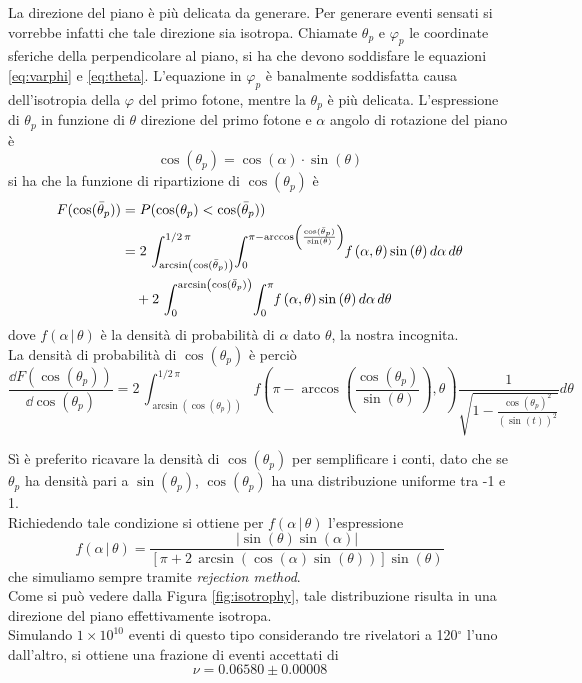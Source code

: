 La direzione del piano è più delicata da generare. Per generare eventi sensati si vorrebbe infatti che tale direzione sia isotropa. Chiamate $\theta_p$ e $\varphi_p$ le coordinate sferiche della perpendicolare al piano, si ha che devono soddisfare le equazioni \ref{eq:varphi} e \ref{eq:theta}. L'equazione in $\varphi_p$ è banalmente soddisfatta causa dell'isotropia della $\varphi$ del primo fotone, mentre la $\theta_p$ è più delicata.
L'espressione di $\theta_p$ in funzione di $\theta$ direzione del primo fotone e $\alpha$ angolo di rotazione del piano è
\begin{equation}
	\cos(\theta_p)=\cos(\alpha)\cdot\sin(\theta)
\end{equation}
si ha che la funzione di ripartizione di $\cos(\theta_p)$ è
\begin{equation}
\begin{split}
	F(\cos(\bar\theta_p))& = P(\cos(\theta_p) < \cos(\bar\theta_p)) \\
	& = 2\,\int _{\arcsin \left( \cos(\bar\theta_p) \right) }^{1/2\,\pi }\!\int _{0}^{\pi -\arccos \left( {\frac {\cos(\bar\theta_p)}{\sin \left( \theta \right) }} \right) }\!{\it f} \left( \alpha,\theta \right) \sin \left( \theta \right) {d\alpha}\,{d\theta}\\
	&\quad+2\,\int _{0}^{\arcsin \left( \cos(\bar\theta_p) \right) }\!\int _{0}^{\pi }\!{\it f} \left( \alpha,\theta \right) \sin \left( \theta \right) {d\alpha}\,{d\theta}
\end{split}
\end{equation}
dove $f(\alpha\,|\,\theta)$ è la densità di probabilità di $\alpha$ dato $\theta$, la nostra incognita.\\
La densità di probabilità di $\cos(\theta_p)$ è perciò
\begin{equation}
	\frac{\dd F(\cos(\theta_p))}{\dd\cos(\theta_p)} = 2\,\int _{\arcsin \left( \cos(\theta_p) \right) }^{1/2\,\pi }\!f \left( \pi -\arccos \left( {\frac {\cos(\theta_p)}{\sin \left( \theta \right) }} \right) ,\theta \right) {\frac {1}{\sqrt {1-{\frac {{\cos(\theta_p)}^{2}}{ \left( \sin \left( t \right)  \right) ^{2}}}}}}{d\theta}
\end{equation}

Sì è preferito ricavare la densità di $\cos(\theta_p)$ per semplificare i conti, dato che se $\theta_p$ ha densità pari a $\sin(\theta_p)$, $\cos(\theta_p)$ ha una distribuzione uniforme tra -1 e 1.\\
Richiedendo tale condizione si ottiene per $f(\alpha\,|\,\theta)$ l'espressione
\begin{equation}
	f(\alpha\,|\,\theta) = {\frac { \left| \sin \left( \theta \right) \sin \left( \alpha \right) 
 \right| }{ \left[ \pi +2\,\arcsin \left( \cos \left( \alpha \right) 
\sin \left( \theta \right)  \right)  \right] \sin \left( \theta
 \right) }}
\end{equation}
che simuliamo sempre tramite \textit{rejection method}.\\
Come si può vedere dalla Figura \ref{fig:isotrophy}, tale distribuzione risulta in una direzione del piano effettivamente isotropa.\\


Simulando $1\times 10^{10}$ eventi di questo tipo considerando tre rivelatori a 120$^\circ$ l'uno dall'altro, si ottiene una frazione di eventi accettati di 
$$\nu=0.06580\pm0.00008$$


